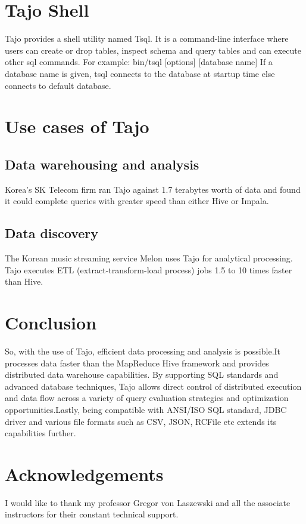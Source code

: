 \documentclass[9pt,twocolumn,twoside]{styles/osajnl}
\begin{document}
\section{Tajo Shell}
\cite{www-apache-tajo-tsql} Tajo provides a shell utility named
Tsql. It is a command-line interface where users can create or drop
tables, inspect schema and query tables and can execute other sql
commands.\newline \newline
\noindent
For example: bin/tsql [options] [database name] \newline If a database
name is given, tsql connects to the database at startup time else
connects to default database.

\section{Use cases of Tajo}
\subsection{Data warehousing and analysis}
\cite{www-apache-tajo-tutorialspoint} Korea’s SK Telecom firm ran Tajo
against 1.7 terabytes worth of data and found it could complete
queries with greater speed than either Hive or Impala.

\subsection{Data discovery}
\cite{www-apache-tajo-tutorialspoint} The Korean music streaming
service Melon uses Tajo for analytical processing. Tajo executes ETL
(extract-transform-load process) jobs 1.5 to 10 times faster than
Hive.

\section{Conclusion}
\cite{www-apache-tajo} So, with the use of Tajo, efficient data
processing and analysis is possible.It processes data faster than the
MapReduce Hive framework and provides distributed data warehouse
capabilities. By supporting SQL standards and advanced database
techniques, Tajo allows direct control of distributed execution and
data flow across a variety of query evaluation strategies and
optimization opportunities.Lastly, being compatible with ANSI/ISO SQL
standard, JDBC driver and various file formats such as CSV, JSON,
RCFile etc extends its capabilities further.

\section*{Acknowledgements}

I would like to thank my professor Gregor von Laszewski and all the
associate instructors for their constant technical support.



 


\newpage

\appendix
\end{document}
